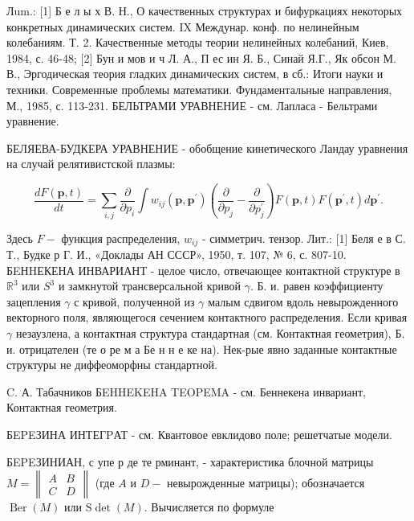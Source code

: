 \documentclass[10pt]{article}
\begin{document}
Лum.: [1] Б е л ы х В. Н., О качественных структурах и бифуркациях некоторых конкретных динамических систем. IX Междунар. конф. по нелинейным колебаниям. Т. 2. Качественные методы теории нелинейных колебаний, Киев, 1984, с. 46-48; [2] Бун и мов и ч Л. А., П ес ин Я. Б., Синай Я.Г., Як обсон М. В., Эргодическая теория гладких динамических систем, в сб.: Итоги науки и техники. Современные проблемы математики. Фундаментальные направления, М., 1985, с. 113-231. БЕЛЬТРАМИ УРАВНЕНИЕ - см. Лапласа - Бельтрами уравнение.



БЕЛЯЕВА-БУДКЕРА УРАВНЕНИЕ - обобщение кинетического Ландау уравнения на случай релятивистской плазмы:



\[

\frac{d F(\boldsymbol{p}, t)}{d t}=\sum_{i, j} \frac{\partial}{\partial p_{i}} \int w_{i j}\left(\boldsymbol{p}, \boldsymbol{p}^{\prime}\right)\left(\frac{\partial}{\partial p_{j}}-\frac{\partial}{\partial p_{j}^{\prime}}\right) F(\boldsymbol{p}, t) F\left(\boldsymbol{p}^{\prime}, t\right) d \boldsymbol{p}^{\prime} .

\]



Здесь $F-$ функция распределения, $w_{i j}$ - симметрич. тензор. Лит.: [1] Беля е в С. Т., Будке р Г. И., «Доклады АН СССР», 1950, т. 107, № 6, с. 807-10. БEНHЕКЕНА ИНВАРИАНТ - целое число, отвечающее контактной структуре в $\mathbb{R}^{3}$ или $S^{3}$ и замкнутой трансверсальной кривой $\gamma$. Б. и. равен коэффициенту зацепления $\gamma$ с кривой, полученной из $\gamma$ малым сдвигом вдоль невырожденного векторного поля, являющегося сечением контактного распределения. Если кривая $\gamma$ незаузлена, а контактная структура стандартная (см. Контактная геометрия), Б. и. отрицателен (те о ре м а Бе н н е ке на). Нек-рые явно заданные контактные структуры не диффеоморфны стандартной.



C. А. Табачников БEHHEKEHA TEOPEMA - см. Беннекена инвариант, Контактная геометрия.



БEPEЗИНА ИНТЕГPАТ - см. Квантовое евклидово поле; решетчатые модели.



БEPEЗИНИАН, с упе р де те рминант, - характеристика блочной матрицы $M=\left\|\begin{array}{ll}A & B \\ C & D\end{array}\right\|$ (где $A$ и $D-$ невырожденные матрицы); обозначается $\operatorname{Ber}(M)$ или $\mathrm{S} \operatorname{det}(M)$. Вычисляется по формуле
\end{document}
